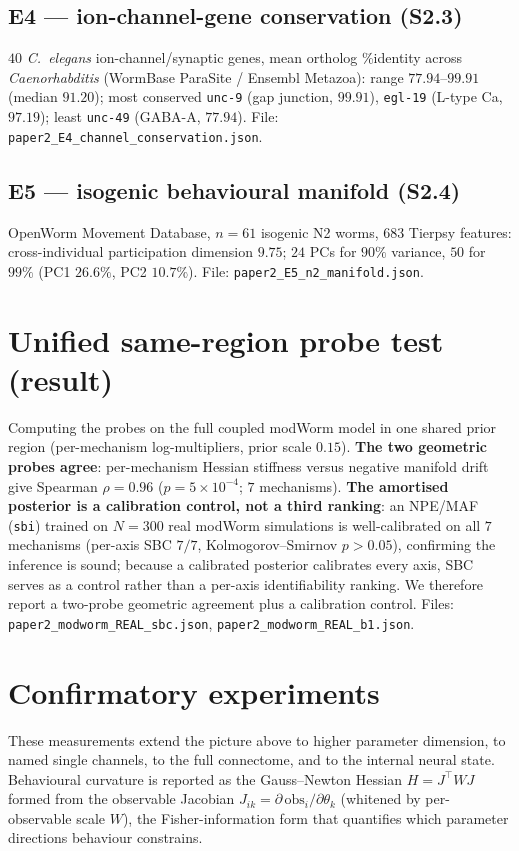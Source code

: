 \documentclass[11pt]{article}
\begin{document}
\subsection{E4 --- ion-channel-gene conservation (S2.3)}
$40$ \emph{C.~elegans} ion-channel/synaptic genes, mean ortholog \%identity across \emph{Caenorhabditis} (WormBase ParaSite / Ensembl Metazoa): range $77.94$--$99.91$ (median $91.20$); most conserved \texttt{unc-9} (gap junction, $99.91$), \texttt{egl-19} (L-type Ca, $97.19$); least \texttt{unc-49} (GABA-A, $77.94$). File: \texttt{paper2\_E4\_channel\_conservation.json}.

\subsection{E5 --- isogenic behavioural manifold (S2.4)}
OpenWorm Movement Database, $n{=}61$ isogenic N2 worms, $683$ Tierpsy features: cross-individual participation dimension $9.75$; $24$ PCs for $90\%$ variance, $50$ for $99\%$ (PC1 $26.6\%$, PC2 $10.7\%$). File: \texttt{paper2\_E5\_n2\_manifold.json}.

\section{Unified same-region probe test (result)}
Computing the probes on the full coupled modWorm model in one shared prior region (per-mechanism log-multipliers, prior scale $0.15$). \textbf{The two geometric probes agree}: per-mechanism Hessian stiffness versus negative manifold drift give Spearman $\rho{=}0.96$ ($p{=}5\times10^{-4}$; $7$ mechanisms). \textbf{The amortised posterior is a calibration control, not a third ranking}: an NPE/MAF (\texttt{sbi}) trained on $N{=}300$ real modWorm simulations is well-calibrated on all $7$ mechanisms (per-axis SBC $7/7$, Kolmogorov--Smirnov $p>0.05$), confirming the inference is sound; because a calibrated posterior calibrates every axis, SBC serves as a control rather than a per-axis identifiability ranking. We therefore report a two-probe geometric agreement plus a calibration control. Files: \texttt{paper2\_modworm\_REAL\_sbc.json}, \texttt{paper2\_modworm\_REAL\_b1.json}.

\section{Confirmatory experiments}
These measurements extend the picture above to higher parameter dimension, to named single channels, to the full connectome, and to the internal neural state. Behavioural curvature is reported as the Gauss--Newton Hessian $H{=}J^\top W J$ formed from the observable Jacobian $J_{ik}{=}\partial\,\mathrm{obs}_i/\partial\theta_k$ (whitened by per-observable scale $W$), the Fisher-information form that quantifies which parameter directions behaviour constrains.
\end{document}
